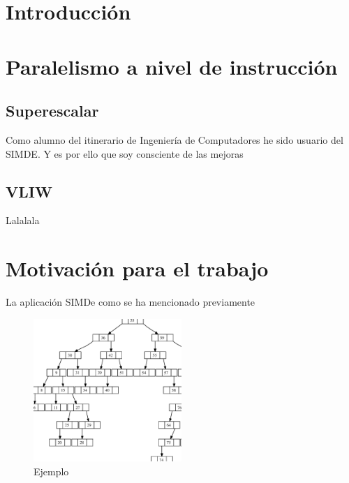 
\section{Introducción}
\label{1:sec:1}


\section{Paralelismo a nivel de instrucción}
\label{1:sec:2}

\subsection{Superescalar}
Como alumno del itinerario de Ingeniería de Computadores he sido usuario del SIMDE.
Y es por ello que soy consciente de las mejoras

\subsection{VLIW}
Lalalala
\section{Motivación para el trabajo}
\label{1:sec:3}

La aplicación SIMDe como se ha mencionado previamente 

\begin{figure}[!th]
\begin{center}
\includegraphics[width=0.5\textwidth]{images/arbolbinario.eps}
\caption{Ejemplo}
\label{fig:ArbolBinario}
\end{center}
\end{figure}

